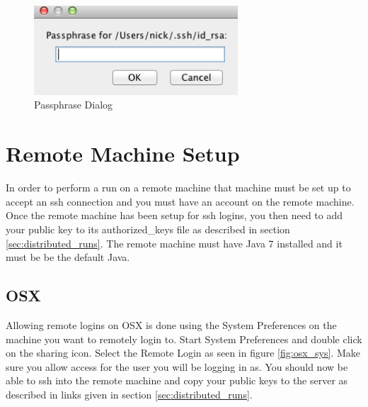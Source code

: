 \documentclass[11pt]{amsart}
\begin{document}
\begin{figure}[h]
\begin{center}
\vspace{.2in}
\centerline {
\includegraphics[width=3in]{images/passphrase.png}
}
\caption{Passphrase Dialog}
\label{fig:passphrase}
\end{center}
\end{figure}


\section{Remote Machine Setup}
\label{sec:remote_machines}

In order to perform a run on a remote machine that machine must be set up to accept an ssh connection and you must have an account on the remote machine. Once the remote machine has been setup for ssh logins, you then need to add your public key to its authorized\_keys file as described in section \ref{sec:distributed_runs}. The remote machine must have Java 7 installed and it must be be the default Java.

\subsection{OSX }
Allowing remote logins on OSX is done using the System Preferences on the machine you want to remotely login to. Start System Preferences and double click on the sharing icon. Select the Remote Login as seen in figure \ref{fig:osx_sys}. Make sure you allow access for the user you will be logging in as. You should now be able to ssh into the remote machine and copy your public keys to the server as described in links given in section \ref{sec:distributed_runs}.
\end{document}
